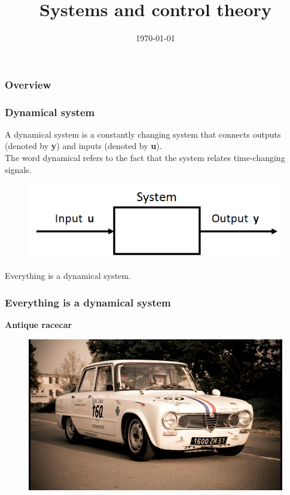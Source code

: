\documentclass{beamer}
\title[Systems and control theory]{Systems and control theory} %
\author{} %
\institute[KU Leuven] %
{
Katholieke Universiteit Leuven \\ %
\medskip
\textit{} %
}
\date{\today} %
\begin{document}
\begin{frame}
\titlepage %
\end{frame}

\begin{frame}
\frametitle{Overview} %
\tableofcontents %
\end{frame}


\begin{frame}
\frametitle{Dynamical system}
A dynamical system is a constantly changing system that connects outputs (denoted by \textbf y) and inputs (denoted by \textbf u).\\The word dynamical refers to the fact that the system relates time-changing signals.
\begin{figure}
\includegraphics[width=0.8\linewidth]{Dynamical_system}
\end{figure}
\medskip
Everything is a dynamical system.
\end{frame}


\begin{frame}
\frametitle{Everything is a dynamical system}
\textbf{Antique racecar}
\begin{figure}
\includegraphics[width=0.9\linewidth]{racecar}
\end{figure}
\end{frame}
\end{document}
